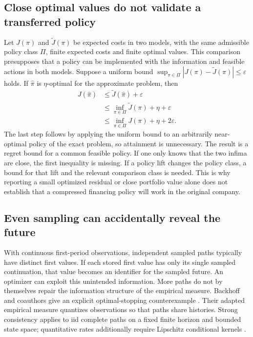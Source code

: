 \documentclass[11pt,a4paper]{article}
\begin{document}
\subsection{Close optimal values do not validate a transferred policy}
Let $J(\pi)$ and $\widetilde J(\pi)$ be expected costs in two models, with
the same admissible policy class $\Pi$, finite expected costs and finite optimal values. This comparison presupposes that a
policy can be implemented with the information and feasible actions in both
models. Suppose a uniform bound
$\sup_{\pi\in\Pi}|J(\pi)-\widetilde J(\pi)|\leq\varepsilon$ holds.
If $\widehat\pi$ is $\eta$-optimal for the approximate problem, then
\begin{align}
J(\widehat\pi)&\leq\widetilde J(\widehat\pi)+\varepsilon\nonumber\\
&\leq\inf_{\pi\in\Pi}\widetilde J(\pi)+\eta+\varepsilon\nonumber\\
&\leq\inf_{\pi\in\Pi}J(\pi)+\eta+2\varepsilon.
\end{align}
The last step follows by applying the uniform bound to an arbitrarily
near-optimal policy of the exact problem, so attainment is unnecessary.
The result is a regret bound for a common feasible policy. If one only knows
that the two infima are close, the first inequality is missing. If a policy
lift changes the policy class, a bound for that lift and the relevant comparison
class is needed. This is why reporting a small optimized residual or close
portfolio value alone does not establish that a compressed financing policy
will work in the original company.

\subsection{Even sampling can accidentally reveal the future}
With continuous first-period observations, independent sampled paths typically
have distinct first values. If each stored first value has only its single
sampled continuation, that value becomes an identifier for the sampled future.
An optimizer can exploit this unintended information. More paths do not by
themselves repair the information structure of the empirical measure.
Backhoff and coauthors give an explicit optimal-stopping counterexample
\cite[Example~7.1]{estimation}. Their adapted empirical measure quantizes
observations so that paths share histories. Strong consistency applies to
iid complete paths on a fixed finite horizon and bounded state space;
quantitative rates additionally require Lipschitz conditional kernels
\cite[Definitions~1.1--1.2, Theorems~1.3, 1.5, 1.7]{estimation}.
\end{document}
